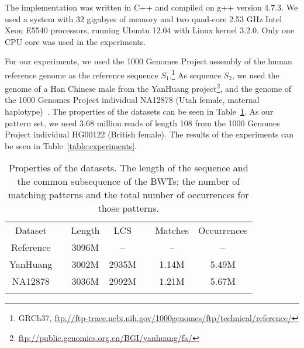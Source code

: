 \documentclass{llncs}
\begin{document}
The implementation was written in C++ and compiled on g++ version 4.7.3. We
used a system with 32 gigabyes of memory and two quad-core 2.53 GHz Intel
Xeon E5540 processors, running Ubuntu 12.04 with Linux kernel 3.2.0. Only one
CPU core was used in the experiments.

For our experiments, we used the 1000 Genomes Project assembly of the human
reference genome as the reference sequence $S_{1}$.\footnote{GRCh37,
\url{ftp://ftp-trace.ncbi.nih.gov/1000genomes/ftp/technical/reference/}} As
sequence $S_{2}$, we used the genome of a Han Chinese male from the
YanHuang
project\footnote{\url{ftp://public.genomics.org.cn/BGI/yanhuang/fa/}}, and the genome of the 1000 Genomes Project individual NA12878 (Utah female, maternal haplotype)~\cite{Rozowsky2011}. The properties of the datasets can be seen in Table~\ref{table:datasets}. As our pattern set, we used 3.68 million reads of length 108 from the 1000 Genomes Project individual HG00122 (British female). The results of the experiments can be seen in
Table~\ref{table:experiments}.

\begin{table}[t]
\centering
\caption{Properties of the datasets. The length of the sequence and the common subsequence of the BWTs; the number of matching patterns and the total number of occurrences for those patterns.}\label{table:datasets}
\begin{tabular}{ccccccc}
\hline
\noalign{\smallskip}
Dataset   & \phantom{00} & Length &   LCS & \phantom{00} & Matches & Occurrences \\
\noalign{\smallskip}
\hline
\noalign{\smallskip}
Reference &              &  3096M &    -- &              &      -- & -- \\
YanHuang  &              &  3002M & 2935M &              &   1.14M & 5.49M \\
NA12878   &              &  3036M & 2992M &              &   1.21M & 5.67M \\
\noalign{\smallskip}
\hline
\end{tabular}
\end{table}
\end{document}
